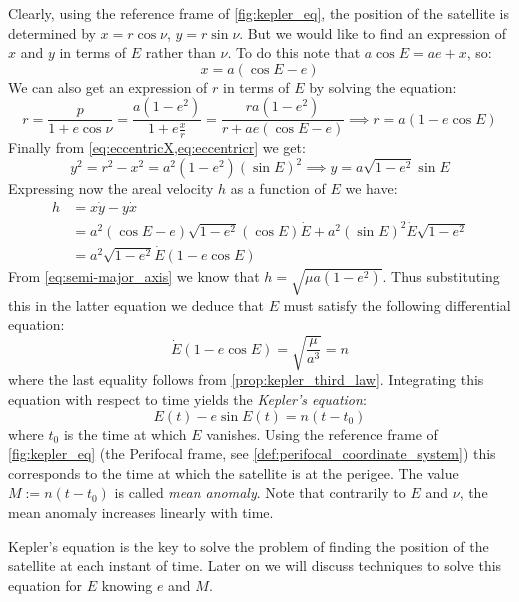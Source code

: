 \documentclass[../main.tex]{subfiles}
\begin{document}
Clearly, using the reference frame of \cref{fig:kepler_eq}, the position of the satellite is determined by $x=r\cos\nu$, $y=r\sin\nu$. But we would like to find an expression of $x$ and $y$ in terms of $E$ rather than $\nu$. To do this note that $a\cos E=ae+x$, so:
\begin{equation}\label{eq:eccentricX}
  x=a(\cos E-e)
\end{equation}
We can also get an expression of $r$ in terms of $E$ by solving the equation:
\begin{equation}\label{eq:eccentricr}
  r=\frac{p}{1+e\cos \nu}=\frac{a(1-e^2)}{1+e\frac{x}{r}}=\frac{ra(1-e^2)}{r+ae(\cos E-e)}\implies r= a(1-e\cos E)
\end{equation}
Finally from \cref{eq:eccentricX,eq:eccentricr} we get:
\begin{equation}
  y^2=r^2-x^2=a^2(1-e^2){(\sin E)}^2\implies y=a\sqrt{1-e^2}\sin E
\end{equation}
Expressing now the areal velocity $h$ as a function of $E$ we have:
\begin{align}
  h & =x\dot{y}-y\dot{x}                                                           \\
    & =a^2(\cos E-e)\sqrt{1-e^2}(\cos E)\dot{E}+a^2{(\sin E)}^2\dot{E}\sqrt{1-e^2} \\
    & =a^2\sqrt{1-e^2}\dot{E}(1-e\cos E)
\end{align}
From \cref{eq:semi-major_axis} we know that $h=\sqrt{\mu a(1-e^2)}$. Thus substituting this in the latter equation we deduce that $E$ must satisfy the following differential equation:
\begin{equation}\label{eq:kepler_equation_differential}
  \dot{E}(1-e\cos E)=\sqrt{\frac{\mu}{a^3}}=n
\end{equation}
where the last equality follows from \cref{prop:kepler_third_law}. Integrating this equation with respect to time yields the \emph{Kepler's equation}:
\begin{equation}\label{eq:kepler_equation}
  E(t)-e\sin E(t)=n(t-t_0)
\end{equation}
where $t_0$ is the time at which $E$ vanishes. Using the reference frame of \cref{fig:kepler_eq} (the Perifocal frame, see \cref{def:perifocal_coordinate_system}) this corresponds to the time at which the satellite is at the perigee. The value $M:=n(t-t_0)$ is called \emph{mean anomaly}. Note that contrarily to $E$ and $\nu$, the mean anomaly increases linearly with time.

Kepler's equation is the key to solve the problem of finding the position of the satellite at each instant of time. Later on we will discuss techniques to solve this equation for $E$ knowing $e$ and $M$.
\end{document}
